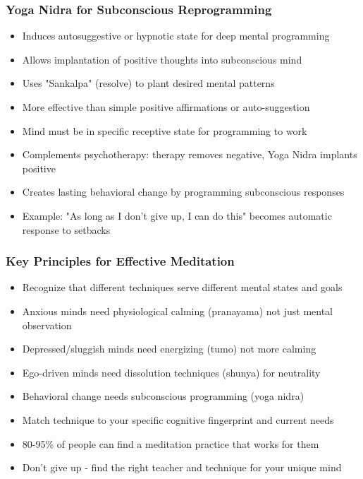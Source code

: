 \begin{frame}[fragile]\frametitle{Yoga Nidra for Subconscious Reprogramming}
      \begin{itemize}
	\item Induces autosuggestive or hypnotic state for deep mental programming
	\item Allows implantation of positive thoughts into subconscious mind
	\item Uses "Sankalpa" (resolve) to plant desired mental patterns
	\item More effective than simple positive affirmations or auto-suggestion
	\item Mind must be in specific receptive state for programming to work
	\item Complements psychotherapy: therapy removes negative, Yoga Nidra implants positive
	\item Creates lasting behavioral change by programming subconscious responses
	\item Example: "As long as I don't give up, I can do this" becomes automatic response to setbacks
	  \end{itemize}
\end{frame}

\begin{frame}[fragile]\frametitle{Key Principles for Effective Meditation}
      \begin{itemize}
	\item Recognize that different techniques serve different mental states and goals
	\item Anxious minds need physiological calming (pranayama) not just mental observation
	\item Depressed/sluggish minds need energizing (tumo) not more calming
	\item Ego-driven minds need dissolution techniques (shunya) for neutrality
	\item Behavioral change needs subconscious programming (yoga nidra)
	\item Match technique to your specific cognitive fingerprint and current needs
	\item 80-95\% of people can find a meditation practice that works for them
	\item Don't give up - find the right teacher and technique for your unique mind
	  \end{itemize}
\end{frame}

